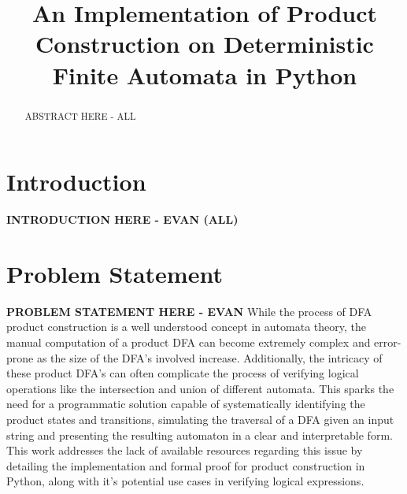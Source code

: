 \documentclass[conference]{IEEEtran}
\begin{document}
\title{An Implementation of Product Construction on Deterministic Finite Automata in Python}

\author{
\and
{}
\and
{}
}

\maketitle

\begin{abstract}
ABSTRACT HERE - ALL
\end{abstract}

\section{Introduction}
\textbf{INTRODUCTION HERE - EVAN (ALL)}

\section{Problem Statement}
\textbf{PROBLEM STATEMENT HERE - EVAN}
While the process of DFA product construction is a well understood concept in automata theory, the manual computation of a product DFA can become extremely complex and error-prone as the size of the DFA's involved increase. Additionally, the intricacy of these product DFA's can often complicate the process of verifying logical operations like the intersection and union of different automata. This sparks the need for a programmatic solution capable of systematically identifying the product states and transitions, simulating the traversal of a DFA given an input string and presenting the resulting automaton in a clear and interpretable form. This work addresses the lack of available resources regarding this issue by detailing the implementation and formal proof for product construction in Python, along with it's potential use cases in verifying logical expressions.
\end{document}

